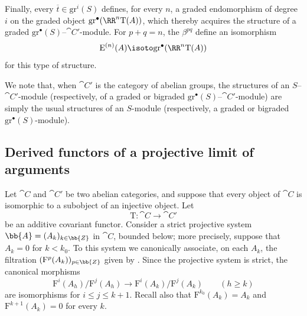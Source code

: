 \begin{env}[13.6.6]
Finally, every $\overline{t}\in\mathrm{gr}^i(S)$ defines, for every
$n$, a graded endomorphism of degree $i$ on the graded object
$\mathrm{gr}^\bullet(\RR^n\mathrm{T}(A))$, which thereby acquires the
structure of a graded
$\mathrm{gr}^\bullet(S)$--$\cat{C}'$-module.
For $p+q=n$, the $\beta^{pq}$ define an isomorphism
\[
  \mathrm{E}^{(n)}(A)
  \isoto
  \mathrm{gr}^\bullet(\RR^n\mathrm{T}(A))
\]
for this type of structure.

We note that, when $\cat{C}'$ is the category of abelian groups, the
structures of an $S$--$\cat{C}'$-module (respectively, of a graded or
bigraded $\mathrm{gr}^\bullet(S)$--$\cat{C}'$-module) are simply the
usual structures of an $S$-module (respectively, a graded or
bigraded $\mathrm{gr}^\bullet(S)$-module).
\end{env}

\subsection{Derived functors of a projective limit of arguments}
\label{subsection:0.13.7}
\label{0.13.7}

\begin{env}[13.7.1]
\label{0.13.7.1}
Let $\cat{C}$ and $\cat{C}'$ be two abelian categories, and suppose
that every object of $\cat{C}$ is isomorphic to a subobject of an
injective object.
Let
\[
  \mathrm{T}:\cat{C}\longrightarrow\cat{C}'
\]
be an additive covariant functor.
Consider a strict projective system
$\bb{A}=(A_k)_{k\in\bb{Z}}$ in $\cat{C}$, bounded below; more
precisely, suppose that $A_k=0$ for $k<k_0$.
To this system we canonically associate, on each $A_k$, the
filtration $(\mathrm{F}^p(A_k))_{p\in\bb{Z}}$ given by
.
Since the projective system is strict, the canonical morphisms
\begin{equation}
\label{0.13.7.1.1}
\tag{13.7.1.1}
  \mathrm{F}^i(A_h)/\mathrm{F}^j(A_h)
  \longrightarrow
  \mathrm{F}^i(A_k)/\mathrm{F}^j(A_k)
  \qquad(h\geq k)
\end{equation}
are isomorphisms for $i\leq j\leq k+1$.
Recall also that
$\mathrm{F}^{k_0}(A_k)=A_k$ and
$\mathrm{F}^{k+1}(A_k)=0$ for every $k$.
\end{env}

